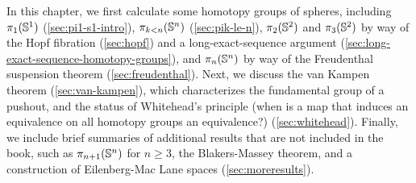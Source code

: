 In this chapter, we first calculate some homotopy groups of spheres,
including $\pi_1(\mathbb{S} ^1)$ (\autoref{sec:pi1-s1-intro}), $\pi_{k<n}(\mathbb{S}
^n)$ (\autoref{sec:pik-le-n}), $\pi_2(\mathbb{S} ^2)$ and $\pi_3(\mathbb{S} ^2)$ by
way of the Hopf fibration (\autoref{sec:hopf}) and a long-exact-sequence
argument (\autoref{sec:long-exact-sequence-homotopy-groups}), and
$\pi_n(\mathbb{S} ^n)$ by way of the Freudenthal suspension theorem
(\autoref{sec:freudenthal}).  Next, we discuss the van Kampen theorem
(\autoref{sec:van-kampen}), which characterizes the fundamental group of
a pushout, and the status of Whitehead's principle (when is a map that
induces an equivalence on all homotopy groups an equivalence?)
(\autoref{sec:whitehead}).  Finally, we include brief summaries of
additional results that are not included in the book, such as
$\pi_{n+1}(\mathbb{S} ^n)$ for $n\ge 3$, the Blakers-Massey theorem, and a
construction of Eilenberg-Mac Lane spaces (\autoref{sec:moreresults}).






